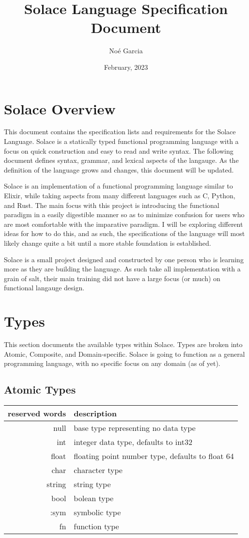 \documentclass{article}
\title{
	\vspace{2in}
	\textmd{\textbf{Solace Language Specification Document}}
	\vspace{3in}
}
\author{No\'e Garcia}
\date{February, 2023}
\begin{document}
\maketitle
\newpage

\section{Solace Overview}
This document contains the specification lists and requirements for the Solace Language.
Solace is a statically typed functional programming language with a focus on quick
construction and easy to read and write syntax. The following document defines syntax,
grammar, and lexical aspects of the langauge. As the definition of the language grows
and changes, this document will be updated.

Solace is an implementation of a functional programming language similar to Elixir,
while taking aspects from many different languages such as C, Python, and Rust.
The main focus with this project is introducing the functional paradigm in a easily
digestible manner so as to minimize confusion for users who are most comfortable with
the imparative paradigm. I will be exploring different ideas for how to do this, and as
such, the specifications of the language will most likely change quite a bit until a more
stable foundation is established.

Solace is a small project designed and constructed by one person who is learning more
as they are building the language. As such take all implementation with a grain of salt,
their main training did not have a large focus (or much) on functional langauge design.


\section{Types}
This section documents the available types within Solace. Types are broken into Atomic,
Composite, and Domain-specific. Solace is going to function as a general programming language,
with no specific focus on any domain (as of yet).

\subsection{Atomic Types}
\begin{tabular}{r|l}
	reserved words & description \\
	\hline
	\hline
	null & base type representing no data type \\
	int & integer data type, defaults to int32 \\
	float & floating point number type, defaults to float 64 \\
	char & character type \\
	string & string type \\
	bool & bolean type \\
	:sym & symbolic type \\
	fn & function type \\
	\hline
\end{tabular}
\end{document}
